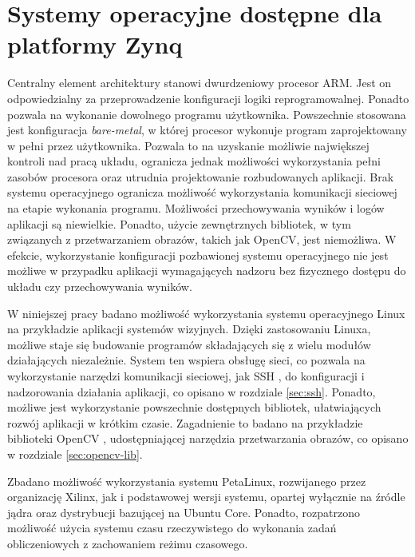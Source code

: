 
\section{Systemy operacyjne dostępne dla platformy Zynq} %
\label{sec:arm-programming}

Centralny element architektury stanowi dwurdzeniowy procesor ARM. 
Jest on odpowiedzialny za przeprowadzenie konfiguracji logiki reprogramowalnej. 
Ponadto pozwala na wykonanie dowolnego programu użytkownika. 
Powszechnie stosowana jest konfiguracja \textit{bare-metal}, w której procesor wykonuje program zaprojektowany w pełni przez użytkownika. 
Pozwala to na uzyskanie możliwie największej kontroli nad pracą układu, ogranicza jednak możliwości wykorzystania pełni zasobów procesora oraz utrudnia projektowanie rozbudowanych aplikacji. 
Brak systemu operacyjnego ogranicza możliwość wykorzystania komunikacji sieciowej na etapie wykonania programu. 
Możliwości przechowywania wyników i logów aplikacji są niewielkie. 
Ponadto, użycie zewnętrznych bibliotek, w tym związanych z przetwarzaniem obrazów, takich jak OpenCV, jest niemożliwa.
W efekcie, wykorzystanie konfiguracji pozbawionej systemu operacyjnego nie jest możliwe w przypadku aplikacji wymagających nadzoru bez fizycznego dostępu do układu czy przechowywania wyników.

W niniejszej pracy badano możliwość wykorzystania systemu operacyjnego Linux na przykładzie aplikacji systemów wizyjnych. 
Dzięki zastosowaniu Linuxa, możliwe staje się budowanie programów składających się z wielu modułów działających niezależnie. 
System ten wspiera obsługę sieci, co pozwala na wykorzystanie narzędzi komunikacji sieciowej, jak SSH \cite{ssh-protocol}, do konfiguracji i nadzorowania działania aplikacji, co opisano w rozdziale \ref{sec:ssh}. 
Ponadto, możliwe jest wykorzystanie powszechnie dostępnych bibliotek, ułatwiających rozwój aplikacji w krótkim czasie. 
Zagadnienie to badano na przykładzie biblioteki OpenCV \cite{opencv-library}, udostępniającej narzędzia przetwarzania obrazów, co opisano w rozdziale \ref{sec:opencv-lib}.

Zbadano możliwość wykorzystania systemu PetaLinux, rozwijanego przez organizację Xilinx, jak i podstawowej wersji systemu, opartej wyłącznie na źródle jądra oraz dystrybucji bazującej na Ubuntu Core.
Ponadto, rozpatrzono możliwość użycia systemu czasu rzeczywistego do wykonania zadań obliczeniowych z zachowaniem reżimu czasowego.



